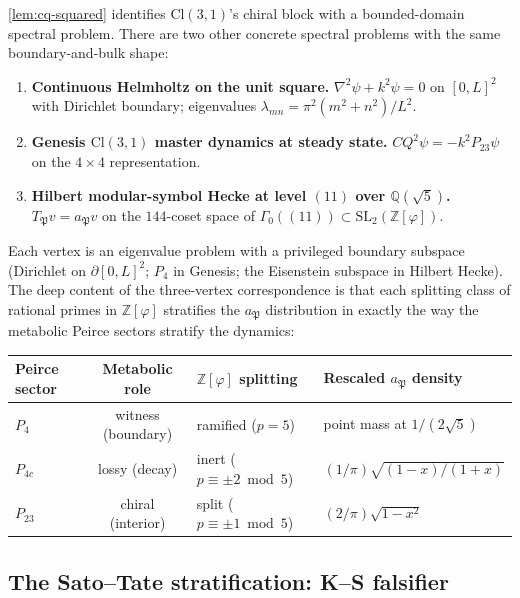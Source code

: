 \documentclass[11pt,a4paper]{article}
\theoremstyle{plain}
\theoremstyle{definition}
\theoremstyle{remark}
\numberwithin{equation}{section}
\providecommand{\Cl}{\mathrm{Cl}}
\providecommand{\Z}{\mathbb{Z}}
\providecommand{\Q}{\mathbb{Q}}
\providecommand{\vp}{\varphi}
\begin{document}
\cref{lem:cq-squared} identifies $\Cl(3,1)$'s chiral block with a
bounded-domain spectral problem. There are two other concrete
spectral problems with the same boundary-and-bulk shape:

\begin{enumerate}[label=(V\arabic*)]
\item \textbf{Continuous Helmholtz on the unit square.}
$\nabla^2 \psi + k^2 \psi = 0$ on $[0,L]^2$ with Dirichlet
boundary; eigenvalues $\lambda_{mn} = \pi^2(m^2 + n^2)/L^2$.
\item \textbf{Genesis $\Cl(3,1)$ master dynamics at steady state.}
$CQ^2 \psi = -k^2 P_{23}\psi$ on the $4\times 4$ representation.
\item \textbf{Hilbert modular-symbol Hecke at level $(11)$ over
$\Q(\sqrt 5)$.} $T_\mathfrak{P} v = a_\mathfrak{P} v$ on the
$144$-coset space of $\Gamma_0((11)) \subset \mathrm{SL}_2(\Z[\vp])$.
\end{enumerate}

Each vertex is an eigenvalue problem with a privileged boundary
subspace (Dirichlet on $\partial[0,L]^2$; $P_4$ in Genesis; the
Eisenstein subspace in Hilbert Hecke). The deep content of the
three-vertex correspondence is that each splitting class of
rational primes in $\Z[\vp]$ stratifies the $a_\mathfrak{P}$
distribution in exactly the way the metabolic Peirce sectors
stratify the dynamics:

\begin{center}
\begin{tabular}{lcll}
\toprule
\textbf{Peirce sector} & \textbf{Metabolic role} & \textbf{$\Z[\vp]$ splitting} & \textbf{Rescaled $a_\mathfrak{P}$ density} \\
\midrule
$P_4$    & witness (boundary)   & ramified ($p = 5$)            & point mass at $1/(2\sqrt 5)$ \\
$P_{4c}$ & lossy (decay)        & inert ($p \equiv \pm 2 \bmod 5$) & $(1/\pi)\sqrt{(1-x)/(1+x)}$ \\
$P_{23}$ & chiral (interior)    & split ($p \equiv \pm 1 \bmod 5$) & $(2/\pi)\sqrt{1 - x^2}$ \\
\bottomrule
\end{tabular}
\end{center}

\subsection{The Sato--Tate stratification: K--S falsifier}
\label{ssec:ks-falsifier}
\end{document}
